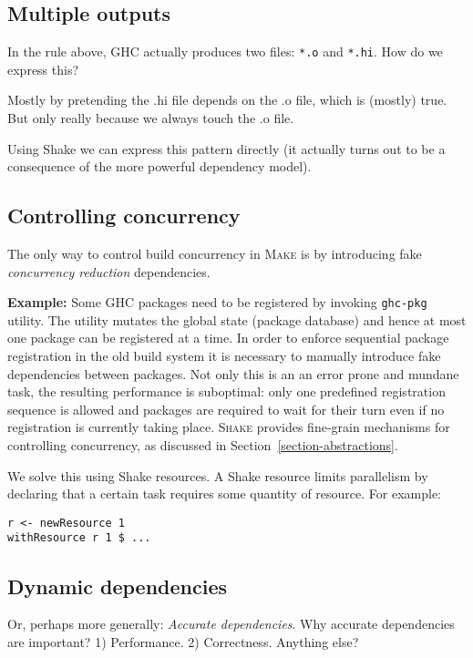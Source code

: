 \subsection{Multiple outputs}

In the rule above, GHC actually produces two files: \texttt{*.o} and \texttt{*.hi}. How do we express this?

Mostly by pretending the .hi file depends on the .o file, which is (mostly) true. But only really because we always touch the .o file.

Using Shake we can express this pattern directly (it actually turns out to be a consequence of the more powerful dependency model).

\subsection{Controlling concurrency}
The only way to control build concurrency in \textsc{Make} is by introducing
fake \emph{concurrency reduction} dependencies. 

\textbf{Example:} Some GHC packages need to be registered by invoking
\texttt{ghc-pkg} utility. The utility mutates the global state (package
database) and hence at most one package can be registered at a time. In order to
enforce sequential package registration in the old build system it is necessary
to manually introduce fake dependencies between packages. Not only this is an
an error prone and mundane task, the resulting performance is suboptimal: only
one predefined registration sequence is allowed and packages are required to
wait for their turn even if no registration is currently taking place.
\textsc{Shake} provides fine-grain mechanisms for controlling concurrency, as
discussed in Section~\ref{section-abstractions}. 

We solve this using Shake resources. A Shake resource limits parallelism by declaring that a certain task requires some quantity of resource. For example:

\begin{verbatim}
r <- newResource 1
withResource r 1 $ ...
\end{verbatim}

\subsection{Dynamic dependencies}

Or, perhaps more generally: \emph{Accurate dependencies}. Why accurate
dependencies are important? 1) Performance. 2) Correctness. Anything else?


